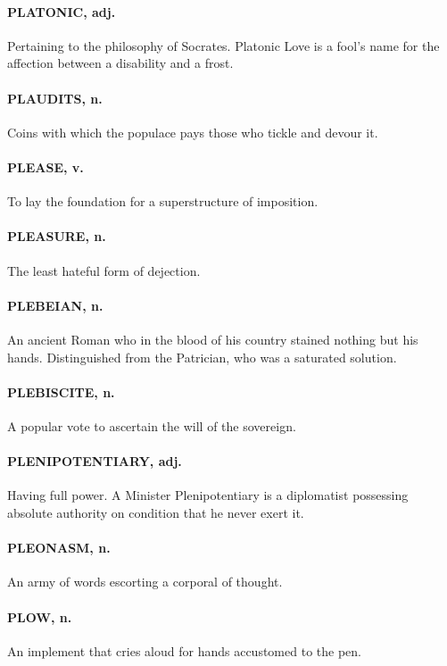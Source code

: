 \documentclass[11pt]{article}
\begin{document}
\paragraph{PLATONIC, adj.}  Pertaining to the philosophy of Socrates.  Platonic
Love is a fool's name for the affection between a disability and a
frost.

\paragraph{PLAUDITS, n.}  Coins with which the populace pays those who tickle and
devour it.

\paragraph{PLEASE, v.}  To lay the foundation for a superstructure of imposition.

\paragraph{PLEASURE, n.}  The least hateful form of dejection.

\paragraph{PLEBEIAN, n.}  An ancient Roman who in the blood of his country stained
nothing but his hands.  Distinguished from the Patrician, who was a
saturated solution.

\paragraph{PLEBISCITE, n.}  A popular vote to ascertain the will of the sovereign.

\paragraph{PLENIPOTENTIARY, adj.}  Having full power.  A Minister Plenipotentiary
is a diplomatist possessing absolute authority on condition that he
never exert it.

\paragraph{PLEONASM, n.}  An army of words escorting a corporal of thought.

\paragraph{PLOW, n.}  An implement that cries aloud for hands accustomed to the
pen.
\end{document}
